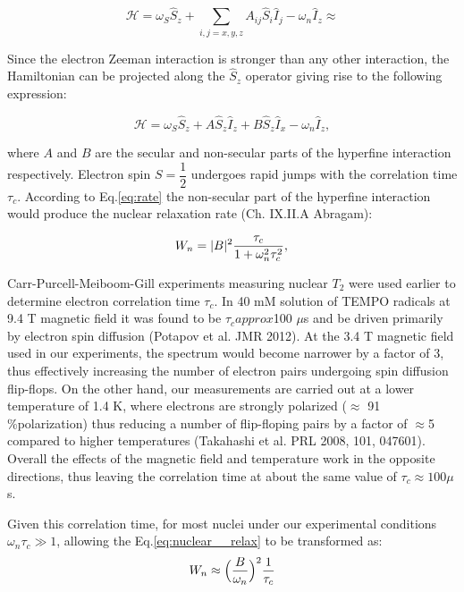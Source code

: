\documentclass[a4paper, 12pt]{article}
\begin{document}
\begin{equation}
       \mathcal{H} =  \omega_S \hat{S}_z + \sum \limits_{i,j=x,y,z} A_{ij} \hat{S}_i \hat{I}_j  - \omega_n \hat{I}_z \approx 
\end{equation}

Since the electron Zeeman interaction is stronger than any other interaction, the Hamiltonian can be projected along the $\hat{S}_z$ operator giving rise to the following expression:

\begin{equation}
\mathcal{H} =  \omega_S \hat{S}_z + A \hat{S}_z \hat{I}_z + B \hat{S}_z \hat{I}_x - \omega_n \hat{I}_z,
\end{equation}

where $A$ and $B$ are the secular and non-secular parts of the hyperfine interaction respectively. Electron spin $S = \dfrac{1}{2}$ undergoes rapid jumps with the correlation time $\tau_c$. According to Eq.\ref{eq:rate} the non-secular part of the hyperfine interaction would produce the nuclear relaxation rate (Ch. IX.II.A Abragam):

\begin{equation}\label{eq:nuclear__relax}
W_{n} =    \vert B \vert ^2 \dfrac{\tau_c}{1+\omega_n^2\tau_c^2},  \\
\end{equation}
  
Carr-Purcell-Meiboom-Gill experiments measuring nuclear $T_2$ were used earlier to determine electron correlation time $\tau_c$. In 40 mM solution of TEMPO radicals at 9.4 T magnetic field it was found to be $\tau_c approx$100 $\mu$s and be driven primarily by electron spin diffusion (Potapov et al. JMR 2012). At the 3.4 T magnetic field used in our experiments, the spectrum would become narrower by a factor of 3, thus effectively increasing the number of electron pairs undergoing spin diffusion flip-flops. On the other hand, our measurements are carried out at a lower temperature of 1.4 K, where electrons are strongly polarized ($\approx$ 91 \%polarization) thus reducing a number of flip-floping pairs by a factor of $\approx$5 compared to higher temperatures (Takahashi et al. PRL 2008, 101, 047601). Overall the effects of the magnetic field and temperature work in the opposite directions, thus leaving the correlation time at  about the same value of  $\tau_c \approx 100 \mu$s. 

 Given this correlation time, for most nuclei under our experimental conditions $\omega_n \tau_c \gg 1$, allowing the Eq.\ref*{eq:nuclear__relax} to be transformed as:
\begin{equation}
W_{n} \approx    \Big( \dfrac{B}{\omega_n} \Big) ^2 \dfrac{1}{\tau_c}  \\
\end{equation}
\end{document}
